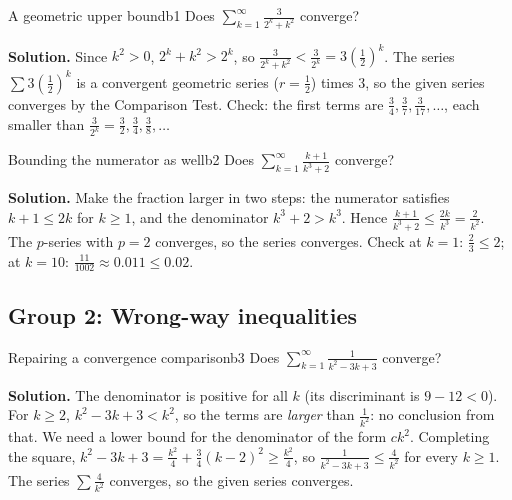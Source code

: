 \documentclass[11pt]{article}
\begin{document}
\begin{exmp}{A geometric upper bound}{b1}
Does $\displaystyle\sum_{k=1}^\infty\frac3{2^k+k^2}$ converge?

\textbf{Solution.} Since $k^2>0$, $2^k+k^2>2^k$, so $\frac3{2^k+k^2}<\frac3{2^k}=3\left(\frac12\right)^k$. The series $\sum3\left(\frac12\right)^k$ is a convergent geometric series ($r=\frac12$) times $3$, so the given series converges by the Comparison Test. Check: the first terms are $\frac34,\frac37,\frac3{17},\dots$, each smaller than $\frac3{2^k}=\frac32,\frac34,\frac38,\dots$
\end{exmp}

\begin{exmp}{Bounding the numerator as well}{b2}
Does $\displaystyle\sum_{k=1}^\infty\frac{k+1}{k^3+2}$ converge?

\textbf{Solution.} Make the fraction larger in two steps: the numerator satisfies $k+1\le2k$ for $k\ge1$, and the denominator $k^3+2>k^3$. Hence $\frac{k+1}{k^3+2}\le\frac{2k}{k^3}=\frac2{k^2}$. The $p$-series with $p=2$ converges, so the series converges. Check at $k=1$: $\frac23\le2$; at $k=10$: $\frac{11}{1002}\approx0.011\le0.02$.
\end{exmp}

\subsection*{Group 2: Wrong-way inequalities}

\begin{exmp}{Repairing a convergence comparison}{b3}
Does $\displaystyle\sum_{k=1}^\infty\frac1{k^2-3k+3}$ converge?

\textbf{Solution.} The denominator is positive for all $k$ (its discriminant is $9-12<0$). For $k\ge2$, $k^2-3k+3<k^2$, so the terms are \emph{larger} than $\frac1{k^2}$: no conclusion from that. We need a lower bound for the denominator of the form $ck^2$. Completing the square, $k^2-3k+3=\frac{k^2}4+\frac34(k-2)^2\ge\frac{k^2}4$, so $\frac1{k^2-3k+3}\le\frac4{k^2}$ for every $k\ge1$. The series $\sum\frac4{k^2}$ converges, so the given series converges.
\end{exmp}
\end{document}
